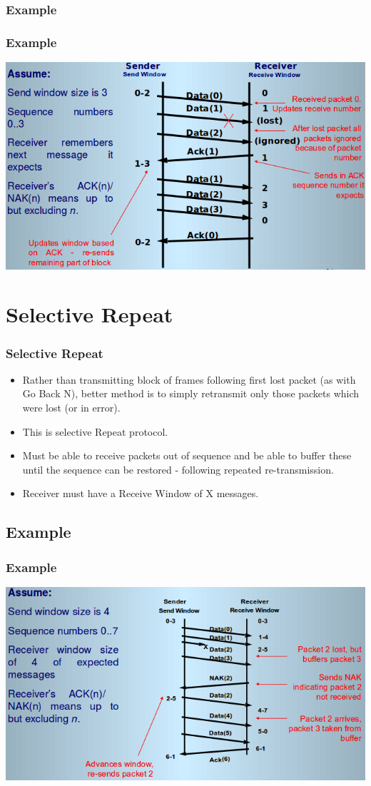 \documentclass{beamer}
\begin{document}
\subsubsection{Example}
\begin{frame}
\frametitle{Example}
\includegraphics[scale=0.5]{nex.png}
\end{frame}
\section{Selective Repeat}
\begin{frame}
\frametitle{Selective Repeat}
\begin{itemize}
\item Rather than transmitting block of frames following first lost packet (as with Go Back N), better method is to simply retransmit only those packets which were lost (or in error).
\item This is selective Repeat protocol.
\item Must be able to receive packets out of sequence and be able to buffer these until the sequence can be restored - following repeated re-transmission.
\item Receiver must have a Receive Window of X messages.
\end{itemize}
\end{frame}
\subsection{Example}
\begin{frame}
\frametitle{Example}
\includegraphics[scale=0.5]{srep.png}
\end{frame}
\end{document}
